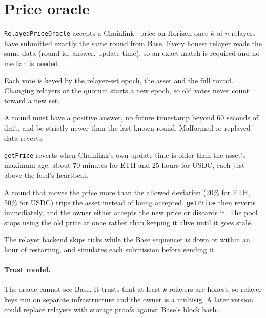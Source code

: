 \documentclass[11pt,a4paper]{article}
\newcommand{\code}[1]{\texttt{#1}}
\begin{document}
\section{Price oracle}

\code{RelayedPriceOracle} accepts a Chainlink~\citep{chainlink} price on Horizen once $k$ of $n$ relayers have
submitted exactly the same round from Base. Every honest relayer reads the same data (round id, answer, update
time), so an exact match is required and no median is needed.

\begin{description}[style=nextline, leftmargin=1.5em, font=\normalfont\bfseries]
  \item[Vote key.] Each vote is keyed by the relayer-set epoch, the asset and the full round. Changing relayers
        or the quorum starts a new epoch, so old votes never count toward a new set.
  \item[Sanity checks.] A round must have a positive answer, no future timestamp beyond 60 seconds of drift,
        and be strictly newer than the last known round. Malformed or replayed data reverts.
  \item[Staleness.] \code{getPrice} reverts when Chainlink's own update time is older than the asset's maximum
        age: about 70 minutes for ETH and 25 hours for USDC, each just above the feed's heartbeat.
  \item[Circuit breaker.] A round that moves the price more than the allowed deviation (20\% for ETH, 50\% for
        USDC) trips the asset instead of being accepted. \code{getPrice} then reverts immediately, and the owner
        either accepts the new price or discards it. The pool stops using the old price at once rather than
        keeping it alive until it goes stale.
\end{description}

The relayer backend skips ticks while the Base sequencer is down or within an hour of restarting, and simulates
each submission before sending it.

\paragraph{Trust model.} The oracle cannot see Base. It trusts that at least $k$ relayers are honest, so relayer
keys run on separate infrastructure and the owner is a multisig. A later version could replace relayers with
storage proofs against Base's block hash.
\end{document}
